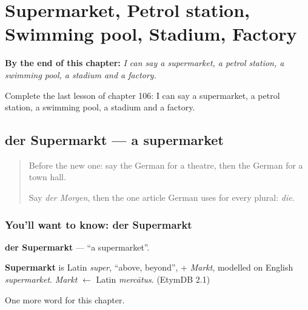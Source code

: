 
\chapter{Supermarket, Petrol station, Swimming pool, Stadium, Factory}
\label{ch:ge-supermarket-petrol-station-swimming-pool-stadium-factory}

\begin{chapteropening}
\textbf{By the end of this chapter:} \emph{I can say a supermarket, a petrol station, a swimming pool, a stadium and a factory.}

Complete the last lesson of chapter 106: I can say a supermarket, a petrol station, a swimming pool, a stadium and a factory.
\end{chapteropening}

\section[der Supermarkt]{der Supermarkt — a supermarket}

\label{lesson:GE-C106-supermarkt}



\begin{quote}
Before the new one: say the German for a theatre, then the German for a town hall.

Say \emph{der Morgen}, then the one article German uses for every plural: \emph{die}.
\end{quote}

\subsection*{You'll want to know: der Supermarkt}
\textbf{der Supermarkt} — \textquotedblleft{}a supermarket\textquotedblright{}.

\begin{cousinweb}
\textbf{Supermarkt} is Latin \emph{super}, \textquotedblleft{}above, beyond\textquotedblright{}, + \emph{Markt}, modelled on English \emph{supermarket}. \emph{Markt} $\leftarrow$ Latin \emph{mercātus}. (EtymDB 2.1)
\end{cousinweb}

\begin{grammarlens}[title={What you've built}]
One more word for this chapter.
\end{grammarlens}

